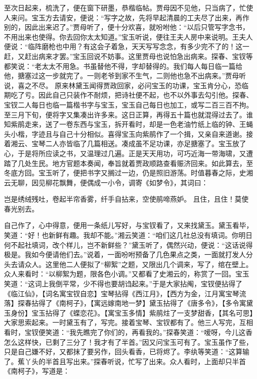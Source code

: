 \documentclass[12pt,oneside]{book}
\begin{document}
至次日起来，梳洗了，便在窗下研墨，恭楷临帖。贾母因不见他，只当病了，忙使人来问。宝玉方去请安，便说：“写字之故，先将早起清晨的工夫尽了出来，再作别的，因此出来迟了。”贾母听了，便十分欢喜，就吩咐他：“以后只管写字念书，不用出来也使得。你去回你太太知道。”宝玉听说，便往王夫人房中来说明。王夫人便说：“临阵磨枪也中用？有这会子着急，天天写写念念，有多少完不了的！这一赶，又赶出病来才罢。”宝玉回说不妨事。这里贾母也说怕急出病来。探春、宝钗等都笑说：“老太太不用急。书虽替他不得，字却替得的。我们每人每日临一篇给他，搪塞过这一步就完了。一则老爷到家不生气，二则他也急不出病来。”贾母听说，喜之不尽。
原来林黛玉闻得贾政回家，必问宝玉的功课，宝玉肯分心，恐临期吃了亏。因此自己只装作不耐烦，把诗社便不起，也不以外事去勾引他。探春、宝钗二人每日也临一篇楷书字与宝玉，宝玉自己每日也加工，或写二百三百不拘。至三月下旬，便将字又集凑出许多来。这日正算，再得五十篇也就混得过去了。谁知紫鹃走来，送了一卷东西与宝玉，拆开看时，却是一色老油竹纸上临的钟、王蝇头小楷，字迹且与自己十分相似。喜得宝玉向紫鹃作了一个揖，又亲自来道谢。接着湘云、宝琴二人亦皆临了几篇相送。凑成虽不足功课，亦足搪塞了。宝玉放了心，于是将所应读之书，又温理过几遍。正是天天用功，可巧近海一带海啸，又遭踏了几处生民。地方官题本奏闻，奉旨就着贾政顺路查看赈济回来。如此算去，至冬底方回。宝玉听了，便把书字又搁过一边，仍是照旧游荡。时值暮春之际，史湘云无聊，因见柳花飘舞，便偶成一小令，调寄《如梦令》，其词曰：

岂是绣绒残吐，卷起半帘香雾，纤手自拈来，空使鹃啼燕妒。
且住，且住！莫使春光别去。

自己作了，心中得意，便用一条纸儿写好，与宝钗看了，又来找黛玉。黛玉看毕，笑道：“好！也新鲜有趣。我却不能。”湘云笑道：“咱们这几社总没有填词。你明日何不起社填词，改个样儿，岂不新鲜些？”黛玉听了，偶然兴动，便说：“这话说得极是。我如今便请他们去。”说着，一面吩咐预备了几色果点之类，一面就打发人分头去请众人。这里他二人便拟了“柳絮”之题，又限出几个调来，写了，绾在壁上。
众人来看时：“以柳絮为题，限各色小调。”又都看了史湘云的，称赏了一回。宝玉笑道：“这词上我倒平常，少不得也要胡诌起来。”于是大家拈阄，宝钗便拈得了《临江仙》，【词名寓宝钗自恋】宝琴拈得《西江月》，【西方为金，江月寓宝琴流落】探春拈得了《南柯子》，【寓远嫁南地一梦】黛玉拈得了《唐多令》，【多令寓黛玉身份】宝玉拈得了《蝶恋花》。【寓宝玉多情】紫鹃炷了一支梦甜香，【其名可思】大家思索起来。一时黛玉有了，写完。接着宝琴、宝钗都有了。他三人写完，互相看时，宝钗便笑道：“我先瞧完了你们的，再看我的。”探春笑道：“嗳呀，今儿这香怎么这样快，已剩了三分了！我才有了半首。”因又问宝玉可有了。宝玉虽作了些，只是自己嫌不好，又都抹了要另作，回头看香，已将烬了。李纨等笑道：“这算输了。蕉丫头的半首且写出来。”探春听说，忙写了出来。众人看时，上面却只半首《南柯子》，写道是：
\end{document}
